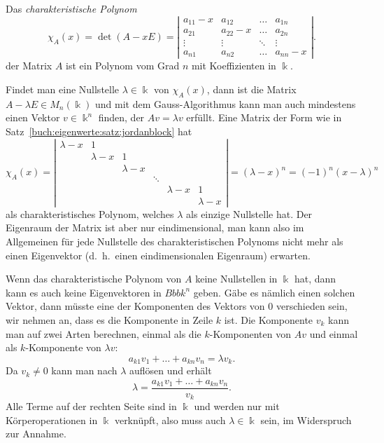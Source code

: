 \begin{definition}
Das {\em charakteristische Polynom}
\[
\chi_A(x)
=
\det (A-x E)
=
\left|
\begin{matrix}
a_{11}-x & a_{12}   & \dots  & a_{1n} \\
a_{21}   & a_{22}-x & \dots  & a_{2n} \\
\vdots   &\vdots    &\ddots  & \vdots \\
a_{n1}   & a_{n2}   &\dots   & a_{nn}-x
\end{matrix}
\right|.
\]
der Matrix $A$ ist ein Polynom vom Grad $n$ mit Koeffizienten in $\Bbbk$.
\end{definition}

Findet man eine Nullstelle $\lambda\in\Bbbk$ von $\chi_A(x)$,
dann ist die Matrix $A-\lambda E\in M_n(\Bbbk)$ und mit dem Gauss-Algorithmus
kann man auch mindestens einen Vektor $v\in \Bbbk^n$ finden,
der $Av=\lambda v$ erfüllt.
Eine Matrix der Form  wie in Satz~\ref{buch:eigenwerte:satz:jordanblock}
hat
\[
\chi_A(x)
=
\left|
\begin{matrix}
\lambda-x &     1     &           &      &         &         \\
          & \lambda-x &     1     &      &         &         \\
          &           & \lambda-x &      &         &         \\
          &           &           &\ddots&         &         \\
          &           &           &      &\lambda-x&     1   \\
          &           &           &      &         &\lambda-x
\end{matrix}
\right|
=
(\lambda-x)^n
=
(-1)^n (x-\lambda)^n
\]
als charakteristisches Polynom, welches $\lambda$ als einzige
Nullstelle hat.
Der Eigenraum der Matrix ist aber nur eindimensional, man kann also
im Allgemeinen für jede Nullstelle des charakteristischen Polynoms
nicht mehr als einen Eigenvektor (d.~h.~einen eindimensionalen Eigenraum)
erwarten.

Wenn das charakteristische Polynom von $A$ keine Nullstellen in $\Bbbk$ hat,
dann kann es auch keine Eigenvektoren in $Bbbk^n$ geben.
Gäbe es nämlich einen solchen Vektor, dann müsste eine der Komponenten
des Vektors von $0$ verschieden sein, wir nehmen an, dass es die Komponente
in Zeile $k$ ist.
Die Komponente $v_k$ kann man auf zwei Arten berechnen, einmal als
die $k$-Komponenten von $Av$ und einmal als $k$-Komponente von $\lambda v$:
\[
a_{k1}v_1+\dots+a_{kn}v_n = \lambda v_k.
\]
Da $v_k\ne 0$ kann man nach $\lambda$ auflösen und erhält
\[
\lambda = \frac{a_{k1}v_1+\dots + a_{kn}v_n}{v_k}.
\]
Alle Terme auf der rechten Seite sind in $\Bbbk$ und werden nur mit
Körperoperationen in $\Bbbk$ verknüpft, also muss auch $\lambda\in\Bbbk$
sein, im Widerspruch zur Annahme.


